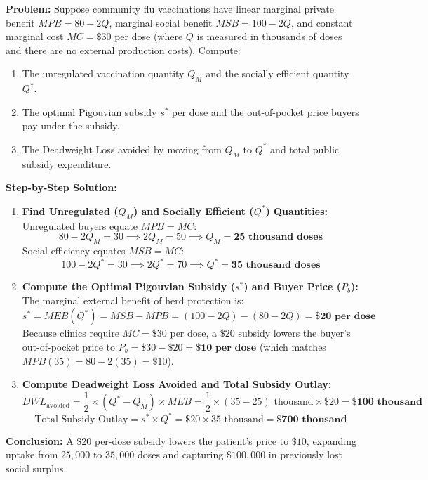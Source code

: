 \documentclass[11pt,letterpaper]{article}
\begin{document}
\begin{tcolorbox}[colback=CourseBlue!5!white,colframe=CourseBlue!80!black,title=\textbf{Work It Out: Designing a Pigouvian Subsidy for Community Vaccinations}]
\textbf{Problem:} Suppose community flu vaccinations have linear marginal private benefit $MPB = 80 - 2Q$, marginal social benefit $MSB = 100 - 2Q$, and constant marginal cost $MC = \$30$ per dose (where $Q$ is measured in thousands of doses and there are no external production costs). Compute:
\begin{enumerate}
    \item The unregulated vaccination quantity $Q_M$ and the socially efficient quantity $Q^*$.
    \item The optimal Pigouvian subsidy $s^*$ per dose and the out-of-pocket price buyers pay under the subsidy.
    \item The Deadweight Loss avoided by moving from $Q_M$ to $Q^*$ and total public subsidy expenditure.
\end{enumerate}

\medskip
\noindent\textbf{Step-by-Step Solution:}
\begin{enumerate}
    \item \textbf{Find Unregulated ($Q_M$) and Socially Efficient ($Q^*$) Quantities:}
    Unregulated buyers equate $MPB = MC$:
    \[
    80 - 2Q_M = 30 \implies 2Q_M = 50 \implies Q_M = \mathbf{25\text{ thousand doses}}
    \]
    Social efficiency equates $MSB = MC$:
    \[
    100 - 2Q^* = 30 \implies 2Q^* = 70 \implies Q^* = \mathbf{35\text{ thousand doses}}
    \]

    \item \textbf{Compute the Optimal Pigouvian Subsidy ($s^*$) and Buyer Price ($P_b$):}
    The marginal external benefit of herd protection is:
    \[
    s^* = MEB(Q^*) = MSB - MPB = (100 - 2Q) - (80 - 2Q) = \mathbf{\$20\text{ per dose}}
    \]
    Because clinics require $MC = \$30$ per dose, a $\$20$ subsidy lowers the buyer's out-of-pocket price to $P_b = \$30 - \$20 = \mathbf{\$10\text{ per dose}}$ (which matches $MPB(35) = 80 - 2(35) = \$10$).

    \item \textbf{Compute Deadweight Loss Avoided and Total Subsidy Outlay:}
    \[
    DWL_{\text{avoided}} = \frac{1}{2} \times (Q^* - Q_M) \times MEB = \frac{1}{2} \times (35 - 25)\text{ thousand} \times \$20 = \mathbf{\$100\text{ thousand}}
    \]
    \[
    \text{Total Subsidy Outlay} = s^* \times Q^* = \$20 \times 35\text{ thousand} = \mathbf{\$700\text{ thousand}}
    \]
\end{enumerate}
\textbf{Conclusion:} A $\$20$ per-dose subsidy lowers the patient's price to $\$10$, expanding uptake from $25{,}000$ to $35{,}000$ doses and capturing $\$100{,}000$ in previously lost social surplus.
\end{tcolorbox}
\end{document}
